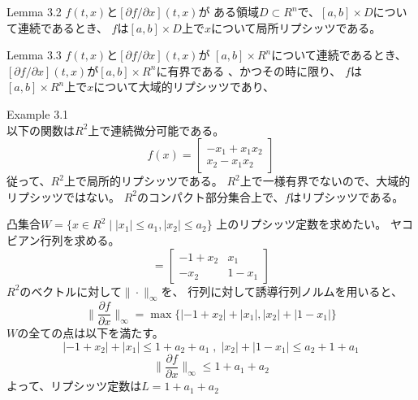 \documentclass{jsarticle}
\begin{document}
\begin{itembox}[l]{Lemma 3.2}
  $f(t,x)$と$[\partial f/\partial x](t,x)$が
  ある領域$D\subset R^n$で、$[a,b]\times D$について連続であるとき、
  $f$は$[a,b]\times D$上で$x$について局所リプシッツである。
\end{itembox}
\begin{itembox}[l]{Lemma 3.3}
  $f(t,x)$と$[\partial f/\partial x](t,x)$が
  $[a,b]\times R^n$について連続であるとき、
  $[\partial f/\partial x](t,x)$が$[a,b]\times R^n$に有界である
  、かつその時に限り、
  $f$は$[a,b]\times R^n$上で$x$について大域的リプシッツであり、

\end{itembox}

Example 3.1\\
以下の関数は$R^2$上で連続微分可能である。
\begin{equation*}
  f(x) = \left[
    \begin{matrix}
      -x_1+x_1x_2\\
      x_2-x_1x_2
    \end{matrix}
  \right]
\end{equation*}
従って、$R^2$上で局所的リプシッツである。
$R^2$上で一様有界でないので、大域的リプシッツではない。
$R^2$のコンパクト部分集合上で、$f$はリプシッツである。

凸集合$W = \{x\in R^2\mid |x_1|\leq a_1,|x_2|\leq a_2\}$
上のリプシッツ定数を求めたい。
ヤコビアン行列を求める。
\begin{equation*}
  [\frac{\partial f}{\partial x}] = \left[
    \begin{matrix}
      -1+x_2&x_1\\
      -x_2&1-x_1
    \end{matrix}
  \right]
\end{equation*}
$R^2$のベクトルに対して$\|\cdot\|_\infty$を、
行列に対して誘導行列ノルムを用いると、
\begin{equation*}
  \|\frac{\partial f}{\partial x}\|_\infty = 
  \max\{|-1+x_2|+|x_1|, |x_2|+|1-x_1|\}
\end{equation*}
$W$の全ての点は以下を満たす。
\begin{equation*}
  |-1+x_2|+|x_1| \leq 1+a_2+a_1 \;,\;
  |x_2|+|1-x_1| \leq a_2+1+a_1
\end{equation*}
\begin{equation*}
  \|\frac{\partial f}{\partial x}\|_\infty\leq 1+a_1+a_2
\end{equation*}
よって、リプシッツ定数は$L=1+a_1+a_2$
\end{document}
